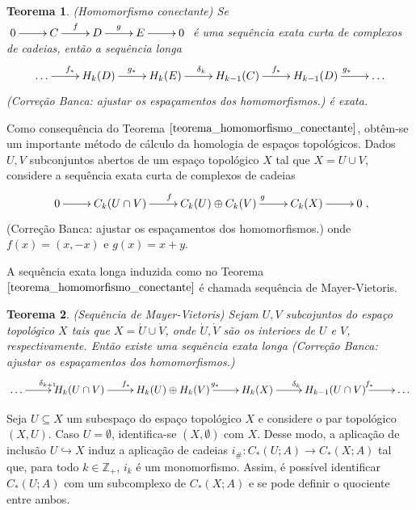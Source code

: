\documentclass[12pt]{book}
\newtheorem{teorema}{Teorema}[section]
\newcommand{\cadeia}[2]{C_{#1}(#2; A)}
\newcommand{\homologiaabrev}[2]{H_{#1}(#2)}
\newcommand{\induzida}[1]{#1_{\#}}
\newcommand{\inteiros}{\mathbb{Z}}
\newcommand{\inteirospos}{\inteiros_{+}}
\newcommand{\alerta}[1]{{\color{red}#1}}
\newcommand{\correcaobanca}[1]{\alerta{(Correção Banca: #1)}}
\begin{document}
	\begin{teorema}\label{teorema_homomorfismo_conectante}
		(Homomorfismo conectante) Se $ \xymatrix{0 \ar[r] & C\ar[r]^{f} & D\ar[r]^{g} & E \ar[r]& 0}$ é uma sequência exata curta de complexos de cadeias, então a sequência longa 
		$$
		\xymatrix{\dots \ar[r]^{f_{*}} & \homologiaabrev{k}{D}\ar[r]^{g_{*}} & \homologiaabrev{k}{E}\ar[r]^{\delta_{k}}& \homologiaabrev{k-1}{C}\ar[r]^{f_{*}} & \homologiaabrev{k-1}{D} \ar[r]^{g_{*}}& \dots} 
		$$
		\correcaobanca{ajustar os espaçamentos dos homomorfismos.}
		é exata.
	\end{teorema}
	
	Como consequência do Teorema $\ref{teorema_homomorfismo_conectante}$, obtêm-se um importante método de cálculo da homologia de espaços topológicos. Dados $U, V$ subconjuntos abertos de um espaço topológico $X$ tal que $X = U\cup V$, considere a sequência exata curta de complexos de cadeias
	$$ 
	\xymatrix{0 \ar[r] & C_{k}(U\cap V)\ar[r]^{f} & C_{k}(U)\oplus C_{k}(V)\ar[r]^{g} & C_{k}(X) \ar[r]& 0},
	$$
		\correcaobanca{ajustar os espaçamentos dos homomorfismos.}
	onde $f(x) = (x,-x)$ e $g(x) = x+y$.
	
	A sequência exata longa induzida como no Teorema $\ref{teorema_homomorfismo_conectante}$ é chamada sequência de Mayer-Vietoris.
	
	\begin{teorema}
		(Sequência de Mayer-Vietoris) Sejam $U, V$ subcojuntos do espaço topológico $X$ tais que $X = \dot{U }\cup \dot{V}$, onde $\dot{U}, \dot{V}$ são os interioes de $U$ e $V$, respectivamente. Então existe uma sequência exata longa 
			\correcaobanca{ajustar os espaçamentos dos homomorfismos.}
		\[
		\xymatrix{\dots \ar[r]^{\delta_{k+1}} & \homologiaabrev{k}{U\cap V}\ar[r]^{f_{*}} & \homologiaabrev{k}{U}\oplus \homologiaabrev{k}{V}\ar[r]^{g_{*}}& \homologiaabrev{k}{X}\ar[r]^{\delta_{k}} & \homologiaabrev{k-1}{U \cap V} \ar[r]^{f_{*}}& \dots} 
		\]
		
	\end{teorema}
	
	Seja $U \subseteq X$ um subespaço do espaço topológico $X$ e considere o par topológico $(X, U)$. Caso $U = \emptyset$, identifica-se $(X, \emptyset)$ com $X$. Desse modo, a aplicação de inclusão $U \hookrightarrow X$ induz a aplicação de cadeias $\induzida{i}: \cadeia{*}{U} \to \cadeia{*}{X}$ tal que, para todo $k \in \inteirospos$, $i_{k}$ é um monomorfismo. Assim, é possível identificar $\cadeia{*}{U}$ com um subcomplexo de $\cadeia{*}{X}$ e se pode definir o quociente entre ambos.
	
\end{document}
